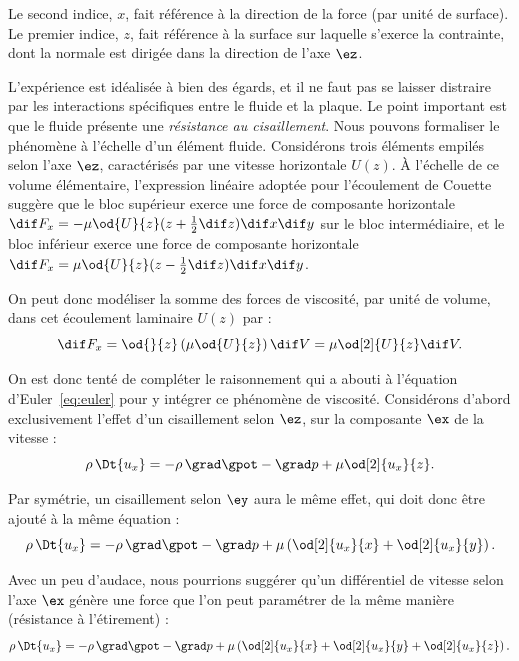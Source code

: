 Le second indice, $x$, fait référence à la direction de la force (par unité de surface). Le premier indice, $z$, fait référence à la surface sur laquelle s'exerce la contrainte, dont la normale est dirigée dans la direction de l'axe $\ez$.


L'expérience est idéalisée à bien des égards, et il ne faut pas se laisser distraire par les interactions spécifiques entre le fluide et la plaque. Le point important est que le fluide présente une \emph{résistance au cisaillement}. Nous pouvons formaliser le phénomène à l'échelle d'un élément fluide. Considérons trois éléments empilés selon l'axe $\ez$, caractérisés par une vitesse horizontale $U(z)$. À l'échelle de ce volume élémentaire, l'expression linéaire adoptée pour l'écoulement de Couette suggère que le bloc supérieur exerce une force de composante horizontale $\dif F_x = -\mu \od{U}{z}(z + \frac{1}{2}\dif z)\dif x\dif y$ sur le bloc intermédiaire, et le bloc inférieur exerce une force de composante horizontale $\dif F_x = \mu \od{U}{z}(z - \frac{1}{2}\dif z)\dif x\dif y$.

On peut donc modéliser la somme des forces de viscosité, par unité de volume, dans cet écoulement laminaire $U(z)$ par :
\begin{equation}
  \dif F_x = \od{}{z} \left( \mu \od{U}{z} \right) \dif V = \mu \od[2]{U}{z} \dif V.
  \label{eq:newtonien}
\end{equation}

On est donc tenté de compléter le raisonnement qui a abouti à l'équation d'Euler~\eqref{eq:euler} pour y intégrer ce phénomène de viscosité. Considérons d'abord exclusivement l'effet d'un cisaillement selon $\ez$, sur la composante $\ex$ de la vitesse :
\begin{displaymath}
  \rho \, \Dt{u_x} = - \rho \, \grad \gpot - \grad p + \mu \od[2]{u_x}{z}.
\end{displaymath}

Par symétrie, un cisaillement selon $\ey$ aura le même effet, qui doit donc être ajouté à la même équation :
\begin{displaymath}
  \rho \, \Dt{u_x} = - \rho \, \grad \gpot - \grad p + \mu \left( \od[2]{u_x}{x} + \od[2]{u_x}{y} \right).
\end{displaymath}

Avec un peu d'audace, nous pourrions suggérer qu'un différentiel de vitesse selon l'axe $\ex$ génère une force que l'on peut paramétrer de la même manière (résistance à l'étirement) :
\begin{equation}
  \rho \, \Dt{u_x} = - \rho \, \grad \gpot - \grad p + \mu \left( \od[2]{u_x}{x} + \od[2]{u_x}{y} + \od[2]{u_x}{z} \right).
  \label{eq:diffusion_ux}
\end{equation}

